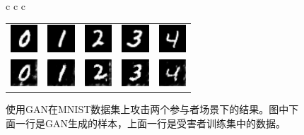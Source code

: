 \documentclass[a4paper]{article}
\begin{document}
\begin{figure}[!ht]
\begin{tabular*}{\textwidth}{c c c}
{\begin{tabular}{lllll}
\includegraphics[width = 0.4in]{fig/original_for_sample_4_1650_100.png}  & \includegraphics[width = 0.4in]{fig/original_for_4_1610_200.png} & \includegraphics[width = 0.4in]{fig/original_for_4_1620_300.png} & \includegraphics[width = 0.4in]{fig/original_for_sample_4_1620_400.png} & \includegraphics[width = 0.4in]{fig/original_for_sample_5_1950_500.png}\\ 
\includegraphics[width = 0.4in]{fig/sample_4_epoch_1650_taskid_100.png}  & \includegraphics[width = 0.4in]{fig/sample_4_epoch_1610_taskid_200.png} & \includegraphics[width = 0.4in]{fig/sample_4_epoch_1620_taskid_300.png} & \includegraphics[width = 0.4in]{fig/sample_4_epoch_1620_taskid_400.png} & \includegraphics[width = 0.4in]{fig/sample_5_epoch_1950_taskid_500.png} \\ 
\end{tabular}
}
\end{tabular*}
\caption{使用GAN在MNIST数据集上攻击两个参与者场景下的结果。图中下面一行是GAN生成的样本，上面一行是受害者训练集中的数据。}
\label{fig:ganresults}
\end{figure}
\end{document}
